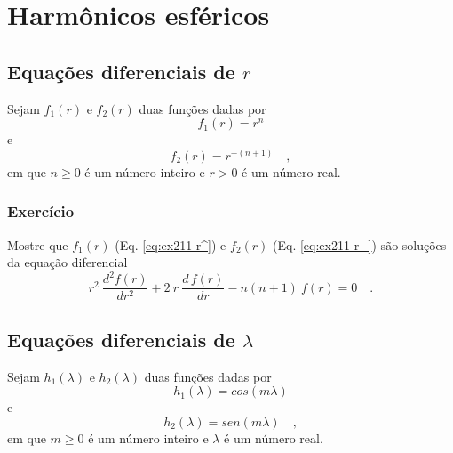\documentclass[10pt,a4paper,fleqn]{article}
\begin{document}
\section{Harm\^{o}nicos esf\'{e}ricos}

\subsection{Equaç\~{o}es diferenciais de $r$}

Sejam $f_{1}(r)$ e $f_{2}(r)$ duas funç\~{o}es dadas por
\begin{equation}
f_{1}(r) = r^{n}
\label{eq:ex211-r^}
\end{equation}
e
\begin{equation}
f_{2}(r) = r^{-(n+1)} \quad ,
\label{eq:ex211-r_}
\end{equation}
em que $n \geqslant 0$ \'{e} um n\'{u}mero inteiro e $r > 0$ \'{e} um n\'{u}mero real. 

\begin{flushleft}
\dotfill
\end{flushleft}

\subsubsection{Exerc\'{i}cio}

Mostre que $f_{1}(r)$ (Eq. \ref{eq:ex211-r^}) e $f_{2}(r)$ (Eq. \ref{eq:ex211-r_}) 
s\~{a}o soluç\~{o}es da equaç\~{a}o diferencial
\begin{equation}
r^{2} \: \frac{d^{2} f(r)}{d r^{2}} + 2 \: r \: \frac{d \, f(r)}{d r} - n(n+1) \: f(r) = 0 \quad .
\label{eq:ex211-eqdif-r}
\end{equation}

\begin{flushleft}
\dotfill
\end{flushleft}

\subsection{Equaç\~{o}es diferenciais de $\lambda$}

Sejam $h_{1}(\lambda)$ e $h_{2}(\lambda)$ duas funç\~{o}es dadas por
\begin{equation}
h_{1}(\lambda) = cos(m \lambda)
\label{eq:ex212-cos}
\end{equation}
e
\begin{equation}
h_{2}(\lambda) = sen(m \lambda) \quad ,
\label{eq:ex212-sen}
\end{equation}
em que $m \geqslant 0$ \'{e} um n\'{u}mero inteiro e $\lambda$ \'{e} um n\'{u}mero real. 
\end{document}
